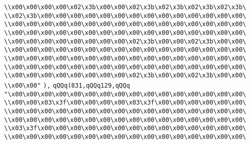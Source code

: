 \verb|\\x00\x00\x00\x00\x02\x3b\x00\x00\x02\x3b\x02\x3b\x02\x3b\x02\x3b\|\newline
\verb|\\x02\x3b\x00\x00\x00\x00\x00\x00\x00\x00\x00\x00\x00\x00\x00\x00\|\newline
\verb|\\x00\x00\x00\x00\x00\x00\x00\x00\x00\x00\x00\x00\x00\x00\x00\x00\|\newline
\verb|\\x00\x00\x00\x00\x00\x00\x00\x00\x00\x00\x00\x00\x00\x00\x00\x00\|\newline
\verb|\\x00\x00\x00\x00\x00\x00\x00\x00\x02\x3b\x00\x00\x02\x3b\x00\x00\|\newline
\verb|\\x00\x00\x00\x00\x00\x00\x00\x00\x00\x00\x00\x00\x00\x00\x00\x00\|\newline
\verb|\\x00\x00\x00\x00\x00\x00\x00\x00\x00\x00\x00\x00\x00\x00\x00\x00\|\newline
\verb|\\x00\x00\x00\x00\x00\x00\x00\x00\x00\x00\x00\x00\x00\x00\x00\x00\|\newline
\verb|\\x00\x00\x00\x00\x00\x00\x00\x00\x02\x3b\x00\x00\x02\x3b\x00\x00\|\newline
\verb|\\x00\x00"|\newline
\verb|),|\newline
\verb|qQQq(831,qQQq129,qQQq|\newline
\verb|"\x00\x00\x00\x00\x00\x00\x00\x00\x00\x00\x00\x00\x00\x00\x00\x00\|\newline
\verb|\\x00\x00\x03\x3f\x00\x00\x00\x00\x03\x3f\x00\x00\x00\x00\x00\x00\|\newline
\verb|\\x00\x00\x00\x00\x00\x00\x00\x00\x00\x00\x00\x00\x00\x00\x00\x00\|\newline
\verb|\\x00\x00\x00\x00\x00\x00\x00\x00\x00\x00\x00\x00\x00\x00\x00\x00\|\newline
\verb|\\x03\x3f\x00\x00\x00\x00\x00\x00\x00\x00\x00\x00\x00\x00\x00\x00\|\newline
\verb|\\x00\x00\x00\x00\x00\x00\x00\x00\x00\x00\x00\x00\x00\x00\x00\x00\|\newline
